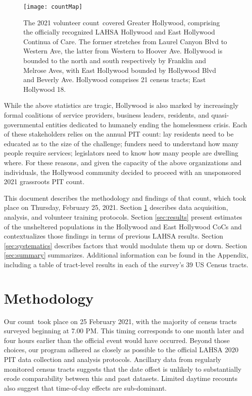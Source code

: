 \documentclass[11pt,twocolumn]{article}
\def\Count{count}
\begin{document}
\begin{figure}
	\centering
	\texttt{[image: countMap]}
	\caption{The 2021 volunteer \Count\ covered Greater Hollywood, comprising the 
			officially recognized LAHSA Hollywood and East Hollywood Continua
			of Care. The former stretches from Laurel Canyon Blvd to Western Ave,
			the latter from Western to Hoover Ave. Hollywood is bounded to the north
			and south respectively by Franklin	and Melrose Aves, with East Hollywood
			bounded by Hollywood Blvd and Beverly Ave. Hollywood comprises
			21 census tracts; East Hollywood 18.}
	\label{fig:map}	
\end{figure}

While the above statistics are tragic, Hollywood is also marked by increasingly formal coalitions of 
service providers, business leaders, residents, and quasi-governmental entities dedicated to humanely 
ending the homelessness crisis. Each of these stakeholders relies on the annual PIT count: lay residents need
to be educated as to the size of the challenge; funders need to understand how many people require services;
legislators need to know how many people are dwelling where. For these reasons, and given the 
capacity of the above organizations and individuals, the Hollywood community decided to proceed with 
an unsponsored 2021 grassroots PIT \Count.

This document describes the methodology and findings of that \Count, which took place on Thursday, 
February 25, 2021. Section \ref{sec:procedure} describes data acquisition, analysis, and volunteer
training protocols. Section \ref{sec:results} present estimates of the unsheltered 
populations in the Hollywood and East Hollywood CoCs and contextualizes those findings in terms of 
previous LAHSA results. Section \ref{sec:systematics} describes factors that would
modulate them up or down. Section \ref{sec:summary} summarizes. Additional information
can be found in the Appendix, including a table of tract-level results in each of the survey's 39 US 
Census tracts.

\section{Methodology}
\label{sec:procedure}

Our \Count\ took place on 25 February 2021, with the majority of census tracts surveyed beginning
at 7.00 PM. This timing corresponds to one month later and four hours earlier than the official event 
would have occurred. Beyond those choices, our program adhered as closely as possible to the official 
LAHSA 2020 PIT data collection and analysis protocols. Ancillary data from regularly monitored 
census tracts suggests that the date offset is unlikely to substantially erode comparability between 
this and past datasets. Limited daytime recounts also suggest that time-of-day effects are sub-dominant.
\end{document}
